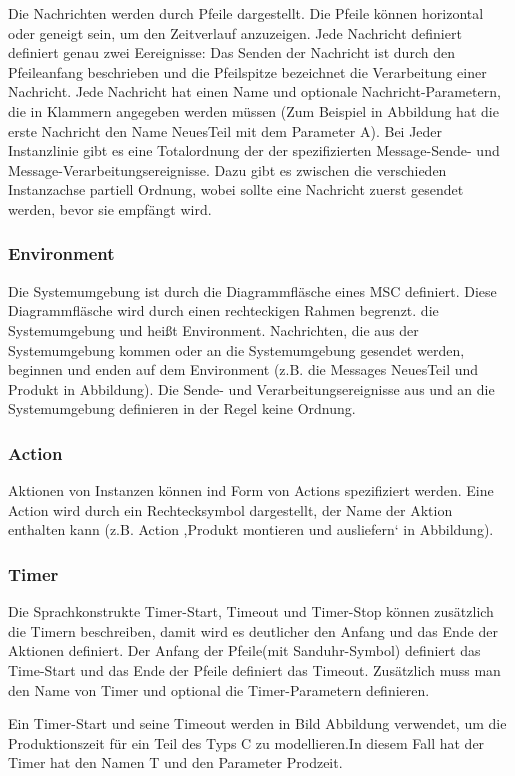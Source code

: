 Die Nachrichten werden durch Pfeile dargestellt. Die Pfeile
können horizontal oder geneigt sein, um den Zeitverlauf
anzuzeigen. 
Jede Nachricht definiert definiert genau zwei Eereignisse: Das Senden der Nachricht ist durch den Pfeileanfang beschrieben und die Pfeilspitze bezeichnet
die Verarbeitung einer Nachricht.
Jede Nachricht hat einen Name und optionale Nachricht-Parametern, die in Klammern angegeben werden müssen (Zum Beispiel in Abbildung hat die erste Nachricht den Name NeuesTeil mit dem Parameter A).
 Bei Jeder Instanzlinie gibt es eine Totalordnung der der spezifizierten
 Message-Sende- und Message-Verarbeitungsereignisse. Dazu gibt es zwischen die verschieden Instanzachse partiell Ordnung, wobei sollte eine Nachricht zuerst gesendet werden, bevor sie empfängt wird. 

\subsubsection{Environment}
Die Systemumgebung ist durch die Diagrammfläsche eines MSC definiert. Diese Diagrammfläsche wird durch einen rechteckigen Rahmen begrenzt.
die Systemumgebung und heißt Environment. Nachrichten,
die aus der Systemumgebung kommen oder an die Systemumgebung
gesendet werden, beginnen und enden auf
dem Environment (z.B. die Messages NeuesTeil und
Produkt in Abbildung). Die Sende- und Verarbeitungsereignisse aus und an die Systemumgebung definieren in der Regel keine Ordnung.

\subsubsection{Action}
Aktionen von Instanzen können ind Form von Actions spezifiziert werden.
Eine Action wird durch ein Rechtecksymbol dargestellt, der Name der Aktion enthalten kann (z.B. Action ,Produkt
montieren und ausliefern‘ in Abbildung).
\\
\subsubsection{Timer}
Die Sprachkonstrukte Timer-Start, Timeout und Timer-Stop können zusätzlich die Timern beschreiben, damit wird es deutlicher den Anfang und das Ende der Aktionen definiert.
Der Anfang der Pfeile(mit Sanduhr-Symbol) definiert das Time-Start und das Ende der Pfeile definiert das Timeout. Zusätzlich muss man den Name von Timer und optional die Timer-Parametern definieren.

Ein Timer-Start und seine Timeout werden in Bild Abbildung verwendet, um die Produktionszeit für ein Teil des Typs C zu modellieren.In diesem Fall hat der Timer hat den Namen T und
den Parameter Prodzeit.
